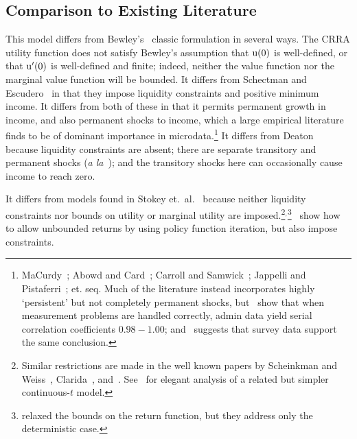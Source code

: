 \documentclass[BufferStockTheory]{subfiles}
\begin{document}
\hypertarget{cfLiterature}{}
\subsection{Comparison to Existing Literature}\label{subsec:Lit}
\hypertarget{DiffFromLit}{} This model differs from Bewley's~\citeyearpar{bewleyPIH} classic formulation in several ways. The CRRA utility function does not satisfy Bewley's assumption that $\mathrm{u}(0)$ is well-defined, or that ${{\mathrm{u}^{\prime}}}(0)$ is well-defined and finite; indeed, neither the value function nor the marginal value function will be bounded.  It differs from Schectman and Escudero~\citeyearpar{seIncFluct} in that they impose liquidity constraints and positive minimum income.  It differs from both of these in that it permits permanent growth in income, and also permanent shocks to income, which a large empirical literature finds to be of dominant importance in microdata.\footnote{MaCurdy~\citeyearpar{macurdyTimeseries}; Abowd and Card~\citeyearpar{acCovariance}; Carroll and Samwick~\citeyearpar{csNature}; Jappelli and Pistaferri~\citeyearpar{jpCins}; et. seq.  Much of the literature instead incorporates highly `persistent' but not completely permanent shocks, but~\cite{dhmImproving} show that when measurement problems are handled correctly, admin data yield serial correlation coefficients $0.98-1.00$; and~\cite{dmHowMuch} suggests that survey data support the same conclusion.}  It differs from Deaton~\citeyearpar{deatonLiqConstr} because liquidity constraints are absent; there are separate transitory and permanent shocks (\textit{a la}~\cite{muthOptimal}); and the transitory shocks here can occasionally cause income to reach zero.

It differs from models found in Stokey et.\ al.~\citeyearpar{slpMethods} because neither liquidity constraints nor bounds on utility or marginal utility are imposed.\footnote{Similar restrictions are made in the well known papers by Scheinkman and Weiss~\citeyearpar{scheinkman&weiss:borrowing}, Clarida~\citeyearpar{claridaErgodic}, and~\cite{cwcUnderUncert}.  See~\cite{tocheUrisk} for elegant analysis of a related but simpler continuous-$t$ model.}$^{,}$\footnote{\cite{asHomogeneous} relaxed the bounds on the return function, but they address only the deterministic case.}~\cite{lsIncFluct} show how to allow unbounded returns by using policy function iteration, but also impose constraints.
\end{document}
